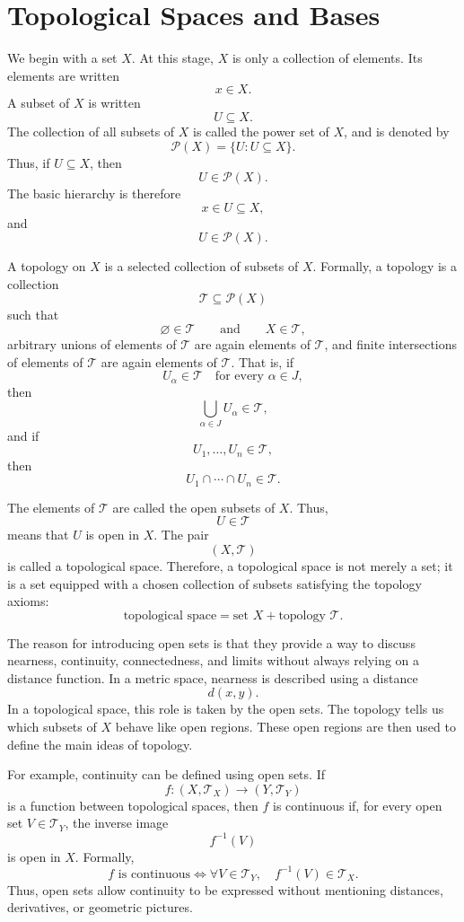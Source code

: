 \documentclass{article}
\begin{document}
	
	\section{Topological Spaces and Bases}
	
	We begin with a set \(X\). At this stage, \(X\) is only a collection of elements. Its elements are written
	\[
	x\in X.
	\]
	A subset of \(X\) is written
	\[
	U\subseteq X.
	\]
	The collection of all subsets of \(X\) is called the power set of \(X\), and is denoted by
	\[
	\mathcal P(X)=\{U:U\subseteq X\}.
	\]
	Thus, if \(U\subseteq X\), then
	\[
	U\in\mathcal P(X).
	\]
	The basic hierarchy is therefore
	\[
	x\in U\subseteq X,
	\]
	and
	\[
	U\in\mathcal P(X).
	\]
	
	A topology on \(X\) is a selected collection of subsets of \(X\). Formally, a topology is a collection
	\[
	\mathcal T\subseteq\mathcal P(X)
	\]
	such that
	\[
	\varnothing\in\mathcal T
	\qquad\text{and}\qquad
	X\in\mathcal T,
	\]
	arbitrary unions of elements of \(\mathcal T\) are again elements of \(\mathcal T\), and finite intersections of elements of \(\mathcal T\) are again elements of \(\mathcal T\). That is, if
	\[
	U_\alpha\in\mathcal T
	\quad\text{for every }\alpha\in J,
	\]
	then
	\[
	\bigcup_{\alpha\in J}U_\alpha\in\mathcal T,
	\]
	and if
	\[
	U_1,\dots,U_n\in\mathcal T,
	\]
	then
	\[
	U_1\cap\cdots\cap U_n\in\mathcal T.
	\]
	
	The elements of \(\mathcal T\) are called the open subsets of \(X\). Thus,
	\[
	U\in\mathcal T
	\]
	means that \(U\) is open in \(X\). The pair
	\[
	(X,\mathcal T)
	\]
	is called a topological space. Therefore, a topological space is not merely a set; it is a set equipped with a chosen collection of subsets satisfying the topology axioms:
	\[
	\text{topological space}=\text{set }X+\text{topology }\mathcal T.
	\]
	
	The reason for introducing open sets is that they provide a way to discuss nearness, continuity, connectedness, and limits without always relying on a distance function. In a metric space, nearness is described using a distance
	\[
	d(x,y).
	\]
	In a topological space, this role is taken by the open sets. The topology tells us which subsets of \(X\) behave like open regions. These open regions are then used to define the main ideas of topology.
	
	For example, continuity can be defined using open sets. If
	\[
	f:(X,\mathcal T_X)\to(Y,\mathcal T_Y)
	\]
	is a function between topological spaces, then \(f\) is continuous if, for every open set \(V\in\mathcal T_Y\), the inverse image
	\[
	f^{-1}(V)
	\]
	is open in \(X\). Formally,
	\[
	f\text{ is continuous}
	\iff
	\forall V\in\mathcal T_Y,\quad f^{-1}(V)\in\mathcal T_X.
	\]
	Thus, open sets allow continuity to be expressed without mentioning distances, derivatives, or geometric pictures.
	
\end{document}
